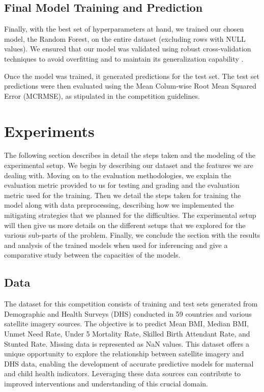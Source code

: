 \documentclass{article}
\begin{document}
\subsection{Final Model Training and Prediction}
Finally, with the best set of hyperparameters at hand, we trained our chosen model, the Random Forest, on the entire dataset (excluding rows with NULL values). We ensured that our model was validated using robust cross-validation techniques to avoid overfitting and to maintain its generalization capability \cite{Kohavi1995}. 

Once the model was trained, it generated predictions for the test set. The test set predictions were then evaluated using the Mean Colum-wise Root Mean Squared Error (MCRMSE), as stipulated in the competition guidelines.

\section{Experiments}
The following section describes in detail the steps taken and the modeling of the experimental setup. We begin by describing our dataset and the features we are dealing with. Moving on to the evaluation methodologies, we explain the evaluation metric provided to us for testing and grading and the evaluation metric used for the training. Then we detail the steps taken for training the model along with data preprocessing, describing how we implemented the mitigating strategies that we planned for the difficulties. The experimental setup will then give us more details on the different setups that we explored for the various sub-parts of the problem. Finally, we conclude the section with the results and analysis of the trained models when used for inferencing and give a comparative study between the capacities of the models.

\subsection{Data}
The dataset for this competition consists of training and test sets generated from Demographic and Health Surveys (DHS) conducted in 59 countries and various satellite imagery sources. The objective is to predict Mean BMI, Median BMI, Unmet Need Rate, Under 5 Mortality Rate, Skilled Birth Attendant Rate, and Stunted Rate. Missing data is represented as NaN values. This dataset offers a unique opportunity to explore the relationship between satellite imagery and DHS data, enabling the development of accurate predictive models for maternal and child health indicators. Leveraging these data sources can contribute to improved interventions and understanding of this crucial domain.
\end{document}
